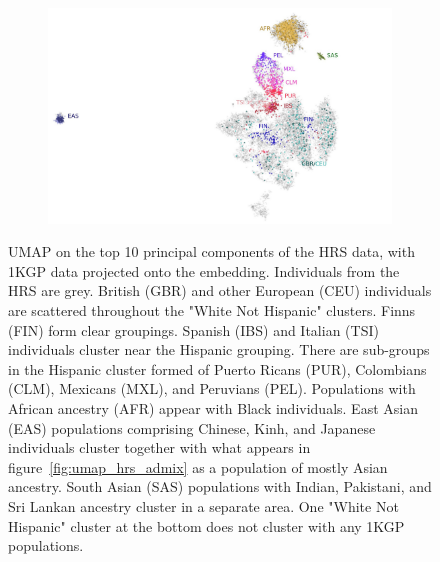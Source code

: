 \documentclass[12pt]{pnas-new}
\begin{document}
\begin{figure}
    \centering
    \begin{subfigure}{\textwidth}
    \includegraphics[width=\textwidth]{images/HRS_1000G_NP1_UMAP_PC10_NC2_NN15_MD05_pca_1kgp_onto_hrs_umap_1kgp_onto_hrs_2018112221116_custom_label.pdf}
    \end{subfigure}
    \caption{UMAP on the top 10 principal components of the HRS data, with 1KGP data projected onto the embedding. Individuals from the HRS are grey. British (GBR) and other European (CEU) individuals are scattered throughout the "White Not Hispanic" clusters. Finns (FIN) form clear groupings. Spanish (IBS) and Italian (TSI) individuals cluster near the Hispanic grouping. There are sub-groups in the Hispanic cluster formed of Puerto Ricans (PUR), Colombians (CLM), Mexicans (MXL), and Peruvians (PEL). Populations with African ancestry (AFR) appear with Black individuals. East Asian (EAS) populations comprising Chinese, Kinh, and Japanese individuals cluster together with what appears in figure~\ref{fig:umap_hrs_admix} as a population of mostly Asian ancestry. South Asian (SAS) populations with Indian, Pakistani, and Sri Lankan ancestry cluster in a separate area. One "White Not Hispanic" cluster at the bottom does not cluster with any 1KGP populations.}
    \label{fig:supp_hrs_1kgp_projected}
\end{figure}
\end{document}
